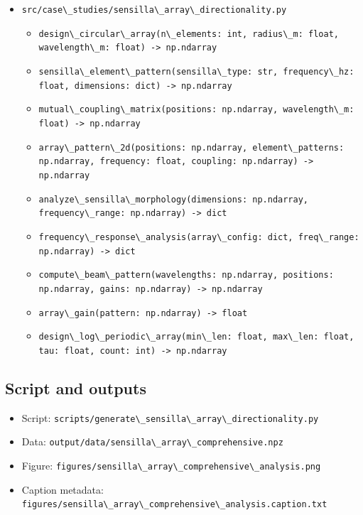 \documentclass[
  13pt,
  a4paperpaper,
  12pt]{article}
\newcommand{\passthrough}[1]{#1}
\providecommand{\tightlist}{%
  \setlength{\itemsep}{0pt}\setlength{\parskip}{0pt}}
\begin{document}
\begin{itemize}
\tightlist
\item
  \passthrough{\lstinline!src/case\_studies/sensilla\_array\_directionality.py!}

  \begin{itemize}
  \tightlist
  \item
    \passthrough{\lstinline!design\_circular\_array(n\_elements: int, radius\_m: float, wavelength\_m: float) -> np.ndarray!}
  \item
    \passthrough{\lstinline!sensilla\_element\_pattern(sensilla\_type: str, frequency\_hz: float, dimensions: dict) -> np.ndarray!}
  \item
    \passthrough{\lstinline!mutual\_coupling\_matrix(positions: np.ndarray, wavelength\_m: float) -> np.ndarray!}
  \item
    \passthrough{\lstinline!array\_pattern\_2d(positions: np.ndarray, element\_patterns: np.ndarray, frequency: float, coupling: np.ndarray) -> np.ndarray!}
  \item
    \passthrough{\lstinline!analyze\_sensilla\_morphology(dimensions: np.ndarray, frequency\_range: np.ndarray) -> dict!}
  \item
    \passthrough{\lstinline!frequency\_response\_analysis(array\_config: dict, freq\_range: np.ndarray) -> dict!}
  \item
    \passthrough{\lstinline!compute\_beam\_pattern(wavelengths: np.ndarray, positions: np.ndarray, gains: np.ndarray) -> np.ndarray!}
  \item
    \passthrough{\lstinline!array\_gain(pattern: np.ndarray) -> float!}
  \item
    \passthrough{\lstinline!design\_log\_periodic\_array(min\_len: float, max\_len: float, tau: float, count: int) -> np.ndarray!}
  \end{itemize}
\end{itemize}

\subsection{Script and outputs}\label{script-and-outputs}

\begin{itemize}
\tightlist
\item
  Script:
  \passthrough{\lstinline!scripts/generate\_sensilla\_array\_directionality.py!}
\item
  Data:
  \passthrough{\lstinline!output/data/sensilla\_array\_comprehensive.npz!}
\item
  Figure:
  \passthrough{\lstinline!figures/sensilla\_array\_comprehensive\_analysis.png!}
\item
  Caption metadata:
  \passthrough{\lstinline!figures/sensilla\_array\_comprehensive\_analysis.caption.txt!}
\end{itemize}
\end{document}
